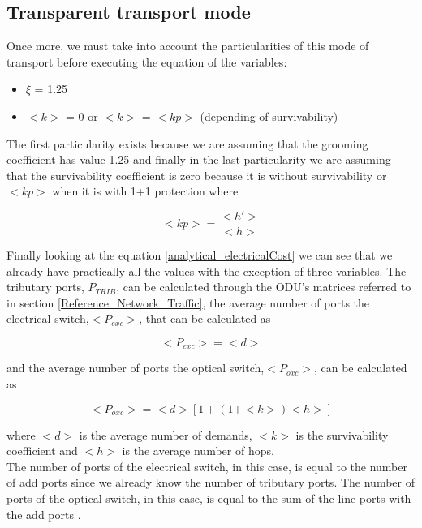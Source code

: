 
\subsection{Transparent transport mode}\label{analytical_Transp_Mode}

Once more, we must take into account the particularities of this mode of transport before executing the equation of the variables:
\begin{itemize}
  \item $\xi$ = 1.25
  \item $<k>$ = 0 or $<k>$ = $<kp>$ (depending of survivability)
\end{itemize}

The first particularity exists because we are assuming that the grooming coefficient has value 1.25 and finally in the last particularity we are assuming that the survivability coefficient is zero because it is without survivability or $<kp>$ when it is with 1+1 protection \cite{aulas} where

\begin{equation}
<kp> = \frac{<h'>}{<h>}
\label{coefficient_protec2}
\end{equation}

\vspace{13pt}
Finally looking at the equation \ref{analytical_electricalCost} we can see that we already have practically all the values with the exception of three variables. The tributary ports, $P_{TRIB}$, can be calculated through the ODU's matrices referred to in section \ref{Reference_Network_Traffic}, the average number of ports the electrical switch,$<P_{exc}>$, that can be calculated as

\begin{equation}
<P_{exc}> = <d>
\label{Pexc_transp}
\end{equation}

\noindent
and the average number of ports the optical switch,$<P_{oxc}>$, can be calculated as

\begin{equation}
<P_{oxc}> = <d> [1 + \left(1 + <k>\right) <h>]
\label{Poxc_transp}
\end{equation}

\noindent
where $<d>$ is the average number of demands, $<k>$	is the survivability coefficient and $<h>$ is the average number of hops.\\
The number of ports of the electrical switch, in this case, is equal to the number of add ports since we already know the number of tributary ports. The number of ports of the optical switch, in this case, is equal to the sum of the line ports with the add ports \cite{aulas}.\\
